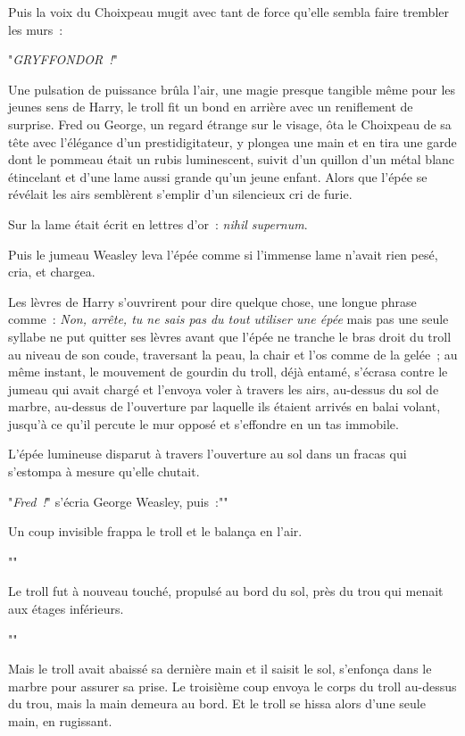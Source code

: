 Puis la voix du Choixpeau mugit avec tant de force qu'elle sembla faire trembler les murs~:

"\emph{GRYFFONDOR~!}"

Une pulsation de puissance brûla l'air, une magie presque tangible même pour les jeunes sens de Harry, le troll fit un bond en arrière avec un reniflement de surprise. Fred ou George, un regard étrange sur le visage, ôta le Choixpeau de sa tête avec l'élégance d'un prestidigitateur, y plongea une main et en tira une garde dont le pommeau était un rubis luminescent, suivit d'un quillon d'un métal blanc étincelant et d'une lame aussi grande qu'un jeune enfant. Alors que l'épée se révélait les airs semblèrent s'emplir d'un silencieux cri de furie.

Sur la lame était écrit en lettres d'or~: \emph{nihil supernum}.

Puis le jumeau Weasley leva l'épée comme si l'immense lame n'avait rien pesé, cria, et chargea.

Les lèvres de Harry s'ouvrirent pour dire quelque chose, une longue phrase comme~: \emph{Non, arrête, tu ne sais pas du tout utiliser une épée} mais pas une seule syllabe ne put quitter ses lèvres avant que l'épée ne tranche le bras droit du troll au niveau de son coude, traversant la peau, la chair et l'os comme de la gelée~; au même instant, le mouvement de gourdin du troll, déjà entamé, s'écrasa contre le jumeau qui avait chargé et l'envoya voler à travers les airs, au-dessus du sol de marbre, au-dessus de l'ouverture par laquelle ils étaient arrivés en balai volant, jusqu'à ce qu'il percute le mur opposé et s'effondre en un tas immobile.

L'épée lumineuse disparut à travers l'ouverture au sol dans un fracas qui s'estompa à mesure qu'elle chutait.

"\emph{Fred~!}" s'écria George Weasley, puis~:""

Un coup invisible frappa le troll et le balança en l'air.

""

Le troll fut à nouveau touché, propulsé au bord du sol, près du trou qui menait aux étages inférieurs.

""

Mais le troll avait abaissé sa dernière main et il saisit le sol, s'enfonça dans le marbre pour assurer sa prise. Le troisième coup envoya le corps du troll au-dessus du trou, mais la main demeura au bord. Et le troll se hissa alors d'une seule main, en rugissant.

